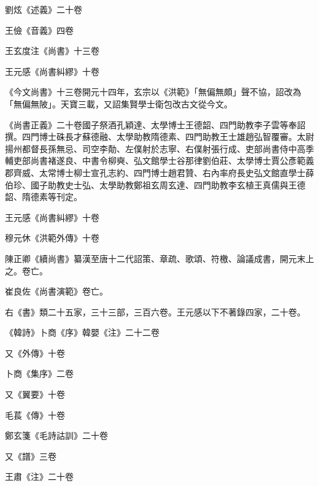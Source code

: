 \begin{pinyinscope}
 劉炫《述義》二十卷



 王儉《音義》四卷



 王玄度注《尚書》十三卷



 王元感《尚書糾繆》十卷



 《今文尚書》十三卷開元十四年，玄宗以《洪範》「無偏無頗」聲不協，詔改為「無偏無陂」。天寶三載，又詔集賢學士衛包改古文從今文。



 《尚書正義》二十卷國子祭酒孔穎達、太學博士王德韶、四門助教李子雲等奉詔撰。四門博士硃長才蘇德融、太學助教隋德素、四門助教王士雄趙弘智覆審。太尉揚州都督長孫無忌、司空李勣、左僕射於志寧、右僕射張行成、吏部尚書侍中高季輔吏部尚書褚遂良、中書令柳奭、弘文館學士谷那律劉伯莊、太學博士賈公彥範義郡齊威、太常博士柳士宣孔志約、四門博士趙君贊、右內率府長史弘文館直學士薛伯珍、國子助教史士弘、太學助教鄭祖玄周玄達、四門助教李玄植王真儒與王德韶、隋德素等刊定。



 王元感《尚書糾繆》十卷



 穆元休《洪範外傳》十卷



 陳正卿《續尚書》纂漢至唐十二代詔策、章疏、歌頌、符檄、論議成書，開元末上之。卷亡。



 崔良佐《尚書演範》卷亡。



 右《書》類二十五家，三十三部，三百六卷。王元感以下不著錄四家，二十卷。



 《韓詩》卜商《序》韓嬰《注》二十二卷



 又《外傳》十卷



 卜商《集序》二卷



 又《翼要》十卷



 毛萇《傳》十卷



 鄭玄箋《毛詩詁訓》二十卷



 又《譜》三卷



 王肅《注》二十卷




\end{pinyinscope}

